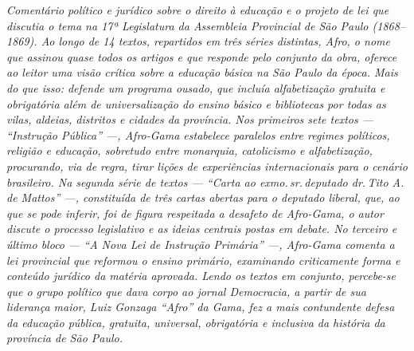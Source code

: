 \begin{argumento}\itshape
Comentário político e jurídico sobre o direito à educação e o projeto de
lei que discutia o tema na 17ª Legislatura da Assembleia Provincial de
São Paulo (1868--1869). Ao longo de 14 textos, repartidos em três séries distintas,
Afro, o nome que assinou quase todos os artigos e que
responde pelo conjunto da obra, oferece ao leitor uma visão crítica
sobre a educação básica na São Paulo da época. Mais do que isso: defende
um programa ousado, que incluía alfabetização gratuita e obrigatória
além de universalização do ensino básico e bibliotecas por todas as
vilas, aldeias, distritos e cidades da província. Nos primeiros sete
textos --- ``Instrução Pública'' ---, Afro-Gama estabelece
paralelos entre regimes políticos, religião e educação, sobretudo entre
monarquia, catolicismo e alfabetização, procurando, via de regra, tirar
lições de experiências internacionais para o cenário brasileiro. Na
segunda série de textos --- ``Carta ao exmo.\,sr.\,deputado dr.\,Tito A. de
Mattos'' ---, constituída de três cartas abertas para o deputado
liberal, que, ao que se pode inferir, foi de figura respeitada a
desafeto de Afro-Gama, o autor discute o processo legislativo e
as ideias centrais postas em debate. No terceiro e último bloco --- ``A
Nova Lei de Instrução Primária'' ---, Afro-Gama comenta a lei
provincial que reformou o ensino primário, examinando criticamente forma
e conteúdo jurídico da matéria aprovada. Lendo os textos em conjunto,
percebe-se que o grupo político que dava corpo ao jornal
\textnormal{Democracia}, a partir de sua liderança maior, Luiz Gonzaga ``Afro''
da Gama, fez a mais contundente defesa da educação pública,
gratuita, universal, obrigatória e inclusiva da história da província de
São Paulo.
\end{argumento}


